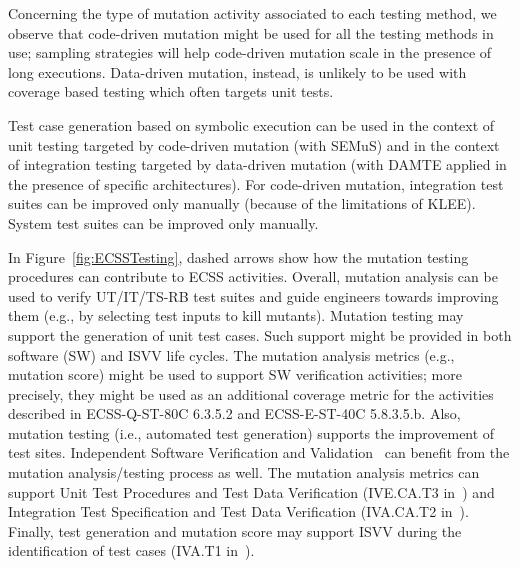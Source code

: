 Concerning the type of mutation activity associated to each testing method, we observe that code-driven mutation might be used for all the testing methods in use; sampling strategies will help code-driven mutation scale in the presence of long executions. Data-driven mutation, instead, is unlikely to be used with coverage based testing which often targets unit tests. 

Test case generation based on symbolic execution can be used in the context of unit testing targeted by code-driven mutation (with SEMuS) and in the context of integration testing targeted by data-driven mutation (with DAMTE applied in the presence of specific architectures). For code-driven mutation, integration test suites can be improved only manually (because of the limitations of KLEE). System test suites can be improved only manually.

In Figure~\ref{fig:ECSSTesting}, dashed arrows show how the mutation testing procedures can contribute to ECSS activities. 
Overall, mutation analysis can be used to verify UT/IT/TS-RB test suites and guide engineers towards improving them (e.g., by selecting test inputs to kill mutants). Mutation testing may support the generation of unit test cases. Such support might be provided in both software (SW) and ISVV life cycles. 
The mutation analysis metrics (e.g., mutation score) might be used to support SW verification activities; more precisely, they might be used as an additional coverage metric for the activities described in ECSS-Q-ST-80C 6.3.5.2 and ECSS-E-ST-40C 5.8.3.5.b. Also, mutation testing (i.e., automated test generation) supports the improvement of test sites. Independent Software Verification and Validation~\cite{ESAISVV} can benefit from the mutation analysis/testing process as well. The mutation analysis metrics can support Unit Test Procedures and Test Data Verification (IVE.CA.T3 in~\cite{ESAISVV}) and Integration Test Specification and Test Data Verification (IVA.CA.T2 in~\cite{ESAISVV}). Finally, test generation and mutation score may support ISVV during the identification of test cases (IVA.T1 in~\cite{ESAISVV}).

\ENDCHANGEDWPT
